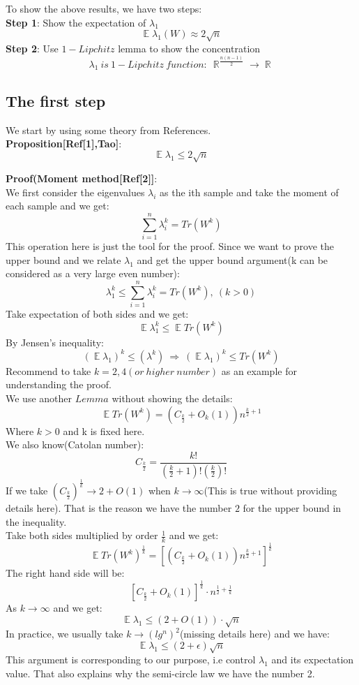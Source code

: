 \documentclass{article}
\DeclareMathOperator{\E}{\mathbb{E}}
\DeclareMathOperator{\R}{\mathbb{R}}
\begin{document}
\noindent
To show the above results, we have two steps:\\
    \textbf{Step 1}: Show the expectation of $\lambda_1$
\[
\mathop{\mathbb{E}}\lambda_1(W) \approx 2\sqrt{n}
\]
    \textbf{Step 2}: Use $1-Lipchitz$ lemma to show the concentration
\[
\lambda_1~is~1-Lipchitz~function:~\R^{\frac{n(n-1)}{2}}{\rightarrow}\R
\]

\subsection{The first step}
We start by using some theory from References.\\

\noindent
\textbf{Proposition[Ref[1],Tao]}:
\[
\E \lambda_1 {\leq} 2\sqrt{n}
\]

\noindent
\textbf{Proof(Moment method[Ref[2]]}:\\
\noindent
We first consider the eigenvalues $\lambda_i$ as the ith sample and take the moment of each sample and we get: 
\[
\sum_{i=1}^n \lambda_i^k = Tr(W^k)
\]
This operation here is just the tool for the proof. Since we want to prove the upper bound and we relate $\lambda_1$ and get the upper bound argument(k can be considered as a very large even number):
\[
\lambda_1^{k} {\leq} \sum_{i=1}^n \lambda_i^k=Tr(W^k),~(k>0)
\]
Take expectation of both sides and we get:
\[
\E \lambda_1^k {\leq} \E Tr(W^k)
\]
By Jensen's inequality:
\[
(\E \lambda_1)^k {\leq} (\lambda^k)~\Rightarrow~(\E \lambda_1)^k{\leq}Tr(W^k)
\]
Recommend to take $k=2,4(or~higher~number)$ as an example for understanding the proof.\\
\noindent
We use another $Lemma$ without showing the details:
\[
\E Tr(W^k) = (C_{\frac{k}{2}}+O_k(1))n^{\frac{k}{2}+1}
\]
Where $k>0$ and k is fixed here.\\
\noindent
We also know(Catolan number): 
\[
C_{\frac{k}{2}} = \frac{k!}{(\frac{k}{2}+1)!(\frac{k}{2})!}
\] 
If we take $(C_{\frac{k}{2}})^{\frac{1}{k}}{\rightarrow}2+O(1)$ when $k{\rightarrow}\infty$(This is true without providing details here). That is the reason we have the number $2$ for the upper bound in the inequality.\\
\noindent
Take both sides multiplied by order $\frac{1}{k}$ and we get:
\[
\E Tr(W^k)^{\frac{1}{k}} = [( C_{\frac{k}{2}} + O_k(1) )n^{\frac{k}{2}+1}]^{\frac{1}{k}}
\]
The right hand side will be:
\[
[C_{\frac{k}{2}} + O_k(1)]^{\frac{1}{k}}{\cdot}n^{\frac{1}{2}+\frac{1}{k}}
\]
As $k \rightarrow \infty$ and we get:
\[
\E \lambda_1 {\leq} (2+O(1)){\cdot}\sqrt{n}
\]
In practice, we usually take $k{\rightarrow}(lg^n)^2$(missing details here) and we have:
\[
\E \lambda_1 {\leq} (2+\epsilon)\sqrt{n}
\]
This argument is corresponding to our purpose, i.e control $\lambda_1$ and its expectation value. That also explains why the semi-circle law we have the number 2.\\
\end{document}
